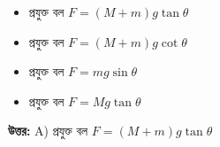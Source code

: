 \documentclass[12pt, a4paper]{article}
\begin{document}
\begin{itemize}[label={}, leftmargin=1cm, itemsep=0.5em]
    \item[\textbf{A)}] প্রযুক্ত বল $F = (M + m)g \tan\theta$
    \item[\textbf{B)}] প্রযুক্ত বল $F = (M + m)g \cot\theta$
    \item[\textbf{C)}] প্রযুক্ত বল $F = mg \sin\theta$
    \item[\textbf{D)}] প্রযুক্ত বল $F = M g \tan\theta$
\end{itemize}

\vspace{0.5em}
\begin{tcolorbox}[answerbox]
    \textbf{\color{success} উত্তর:} A) প্রযুক্ত বল $F = (M + m)g \tan\theta$
\end{tcolorbox}
\vspace{1em}
\end{document}
